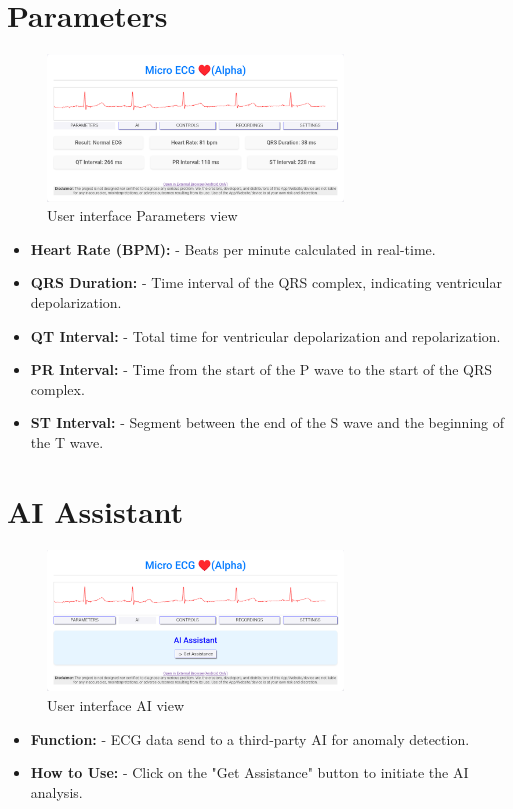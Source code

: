 \section{Parameters}
\begin{figure}[H]
    \centering
    \includegraphics[width=0.7\textwidth]{images/ss/view-param.png}
    \caption{User interface Parameters view}
    \label{fig:ss_param_view}
\end{figure}
\begin{itemize}[leftmargin=*]
    \item \textbf{Heart Rate (BPM):} -  Beats per minute calculated in real-time.
    \item \textbf{QRS Duration:} -  Time interval of the QRS complex, indicating ventricular depolarization.
    \item \textbf{QT Interval:} -  Total time for ventricular depolarization and repolarization.
    \item \textbf{PR Interval:} -  Time from the start of the P wave to the start of the QRS complex.
    \item \textbf{ST Interval:} -  Segment between the end of the S wave and the beginning of the T wave.
\end{itemize}

\section{AI Assistant}
\begin{figure}[H]
    \centering
    \includegraphics[width=0.7\textwidth]{images/ss/view-ai.png}
    \caption{User interface AI view}
    \label{fig:ss_ai_view}
\end{figure}
\begin{itemize}[leftmargin=*]
    \item \textbf{Function:} -  ECG data send to a third-party AI for anomaly detection.
    \item \textbf{How to Use:} -  Click on the "Get Assistance" button to initiate the AI analysis.
\end{itemize}

